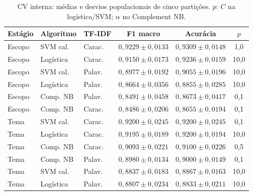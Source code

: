 \begin{table}[!htb]
\centering\small
\caption{CV interna: médias e desvios populacionais de cinco partições. \(p\): \(C\) na logística/SVM; \(\alpha\) no Complement NB.}
\label{tab:comparacao}
\begin{tabular}{lllccc}
\toprule Estágio & Algoritmo & TF-IDF & F1 macro & Acurácia & \(p\)\\ \midrule
Escopo & SVM cal. & Carac. & \(0{,}9229\pm0{,}0133\) & \(0{,}9309\pm0{,}0148\) & 1,0\\
Escopo & Logística & Carac. & \(0{,}9150\pm0{,}0173\) & \(0{,}9236\pm0{,}0159\) & 10,0\\
Escopo & SVM cal. & Palav. & \(0{,}8977\pm0{,}0192\) & \(0{,}9055\pm0{,}0196\) & 10,0\\
Escopo & Logística & Palav. & \(0{,}8664\pm0{,}0356\) & \(0{,}8855\pm0{,}0285\) & 10,0\\
Escopo & Comp. NB & Palav. & \(0{,}8491\pm0{,}0458\) & \(0{,}8673\pm0{,}0417\) & 0,1\\
Escopo & Comp. NB & Carac. & \(0{,}8486\pm0{,}0206\) & \(0{,}8655\pm0{,}0194\) & 0,1\\
\midrule
Tema & SVM cal. & Carac. & \(0{,}9200\pm0{,}0245\) & \(0{,}9200\pm0{,}0245\) & 0,1\\
Tema & Logística & Carac. & \(0{,}9195\pm0{,}0189\) & \(0{,}9200\pm0{,}0194\) & 10,0\\
Tema & Comp. NB & Carac. & \(0{,}9093\pm0{,}0221\) & \(0{,}9100\pm0{,}0226\) & 0,5\\
Tema & Comp. NB & Palav. & \(0{,}8980\pm0{,}0134\) & \(0{,}9000\pm0{,}0149\) & 0,1\\
Tema & SVM cal. & Palav. & \(0{,}8837\pm0{,}0183\) & \(0{,}8867\pm0{,}0163\) & 10,0\\
Tema & Logística & Palav. & \(0{,}8807\pm0{,}0234\) & \(0{,}8833\pm0{,}0211\) & 10,0\\
\bottomrule\end{tabular}
\end{table}
